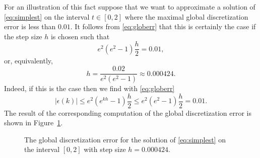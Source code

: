 \documentclass{ximera}
\begin{document}
For an illustration of this fact suppose that we want to approximate 
a solution of \eqref{eq:simplest} on the interval $t\in [0,2]$
where the maximal global discretization 
error is less than $0.01$.
It follows from \eqref{eq:globerr} that this is certainly the case if the
step size $h$ is chosen such that
\[
e^2(e^2-1)\frac{h}{2} = 0.01,
\]
or, equivalently,
\[
h = \frac{0.02}{e^2(e^2-1)} \approx 0.000424.
\]
Indeed, if this is the case then we find  with \eqref{eq:globerr}
\[
|\epsilon(k)| \le e^2(e^{kh}-1)\frac{h}{2} \le e^2(e^2-1)\frac{h}{2} = 0.01.
\]
The result of the corresponding \Matlab computation of the global
discretization error is shown in Figure~\ref{fig:globerr2}.
\begin{figure}[htb]
   \centerline{%
   }
   \caption{The global discretization error for the solution of
   \protect\eqref{eq:simplest} on the interval $[0,2]$ with
   step size $h=0.000424$.}
   \label{fig:globerr2}
\end{figure}



\EXER

\end{document}
